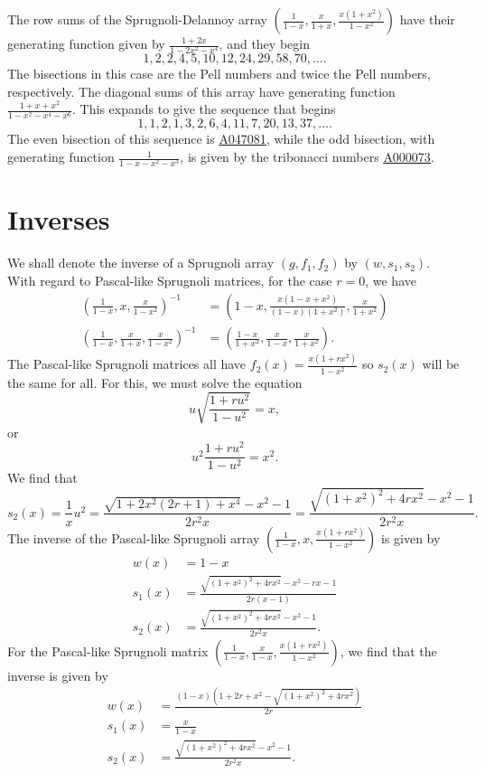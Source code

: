 \documentclass[12pt,reqno]{article}
\theoremstyle{definition}
\newcommand{\seqnum}[1]{\href{http://oeis.org/#1}{\underline{#1}}}
\begin{document}
The row sums of the Sprugnoli-Delannoy array $\left(\frac{1}{1-x}, \frac{x}{1+x}, \frac{x(1+x^2)}{1-x^2}\right)$ have their generating function given by $\frac{1+2x}{1-2x^2-x^4}$, and they begin
$$1, 2, 2, 4, 5, 10, 12, 24, 29, 58, 70,\ldots.$$ The bisections in this case are the Pell numbers and twice the Pell numbers, respectively. The diagonal sums of this array have generating function $\frac{1+x+x^2}{1-x^2-x^4-x^6}$. This expands to give the sequence that begins
$$1, 1, 2, 1, 3, 2, 6, 4, 11, 7, 20, 13, 37,\ldots.$$ The even bisection of this sequence is \seqnum{A047081}, while the odd bisection, with generating function $\frac{1}{1-x-x^2-x^3}$, is given by the tribonacci numbers \seqnum{A000073}.

\section{Inverses}
We shall denote the inverse of a Sprugnoli array $(g, f_1,f_2)$ by $(w, s_1, s_2)$. With regard to Pascal-like Sprugnoli matrices,
for the case $r=0$, we have \cite{Spru}
\begin{align*}\left(\frac{1}{1-x}, x, \frac{x}{1-x^2}\right)^{-1}&=\left(1-x, \frac{x(1-x+x^2)}{(1-x)(1+x^2)}, \frac{x}{1+x^2}\right)\\
\left(\frac{1}{1-x}, \frac{x}{1+x}, \frac{x}{1-x^2}\right)^{-1}&=\left(\frac{1-x}{1+x^2}, \frac{x}{1-x}, \frac{x}{1+x^2}\right).\end{align*}
The Pascal-like Sprugnoli matrices all have $f_2(x)=\frac{x(1+rx^2)}{1-x^2}$ so $s_2(x)$ will be the same for all. For this, we must solve the equation
$$u\sqrt{\frac{1+ru^2}{1-u^2}}=x,$$ or
$$u^2 \frac{1+ru^2}{1-u^2}=x^2.$$
We find that
$$s_2(x)=\frac{1}{x} u^2=\frac{\sqrt{1+2x^2(2r+1)+x^4}-x^2-1}{2r^2x}=\frac{\sqrt{(1+x^2)^2+4rx^2}-x^2-1}{2r^2x}.$$
The inverse of the Pascal-like Sprugnoli array $\left(\frac{1}{1-x}, x, \frac{x(1+rx^2)}{1-x^2}\right)$ is given by
\begin{align*}
w(x)&=1-x\\
s_1(x)&=\frac{\sqrt{(1+x^2)^2+4rx^2}-x^2-rx-1}{2r(x-1)}\\
s_2(x)&=\frac{\sqrt{(1+x^2)^2+4rx^2}-x^2-1}{2r^2x}.\end{align*}
For the Pascal-like Sprugnoli matrix  $\left(\frac{1}{1-x}, \frac{x}{1-x}, \frac{x(1+rx^2)}{1-x^2}\right)$, we find that the inverse is given by
\begin{align*}
w(x)&=\frac{(1-x)(1+2r+x^2-\sqrt{(1+x^2)^2+4rx^2})}{2r}\\
s_1(x)&=\frac{x}{1-x}\\
s_2(x)&=\frac{\sqrt{(1+x^2)^2+4rx^2}-x^2-1}{2r^2x}.\end{align*}
\end{document}
